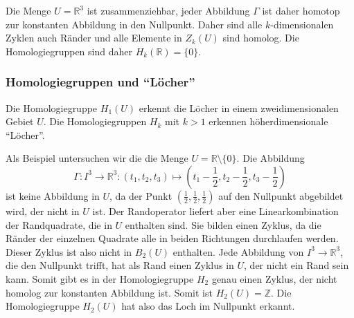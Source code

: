 Die Menge $U=\mathbb{R}^3$ ist zusammenziehbar, jeder Abbildung $\Gamma$
ist daher homotop zur konstanten Abbildung in den Nullpunkt.
Daher sind alle $k$-dimensionalen Zyklen auch Ränder und alle
Elemente in $Z_k(U)$ sind homolog.
Die Homologiegruppen sind daher $H_k(\mathbb{R})=\{0\}$.

%
%
\subsubsection{Homologiegruppen und ``Löcher''}
Die Homologiegruppe $H_1(U)$ erkennt die Löcher in einem zweidimensionalen
Gebiet $U$.
Die Homologiegruppen $H_k$ mit $k>1$ erkennen höherdimensionale ``Löcher''.

Als Beispiel untersuchen wir die die Menge $U=\mathbb{R}\setminus \{0\}$.
Die Abbildung
\[
\Gamma
\colon
I^3
\to
\mathbb{R}^3
:
(t_1,t_2,t_3)
\mapsto
(
t_1-{\textstyle\frac12},
t_2-{\textstyle\frac12},
t_3-{\textstyle\frac12}
)
\]
ist keine Abbildung in $U$, da der Punkt $(\frac12,\frac12,\frac12)$ auf
den Nullpunkt abgebildet wird, der nicht in $U$ ist.
Der Randoperator liefert aber eine Linearkombination der Randquadrate,
die in $U$ enthalten sind.
Sie bilden einen Zyklus, da die Ränder der einzelnen Quadrate alle
in beiden Richtungen durchlaufen werden.
Dieser Zyklus ist also nicht in $B_2(U)$ enthalten.
Jede Abbildung von $I^3\to \mathbb{R}^3$, die den Nullpunkt trifft,
hat als Rand einen Zyklus in $U$, der nicht ein Rand sein kann.
Somit gibt es in der Homologiegruppe $H_2$ genau einen Zyklus, der
nicht homolog zur konstanten Abbildung ist.
Somit ist $H_2(U)=\mathbb{Z}$.
Die Homologiegruppe $H_2(U)$ hat also das Loch im Nullpunkt erkannt.
